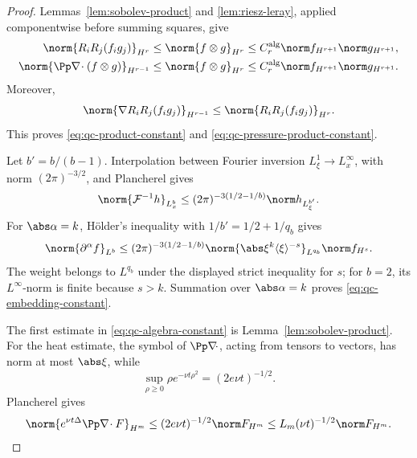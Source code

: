 \begin{proof}
Lemmas~\ref{lem:sobolev-product} and \ref{lem:riesz-leray}, applied
componentwise before summing squares, give
\begin{align*}
 \norm{R_iR_j(f_i g_j)}_{H^r}
 &\le\norm{f\otimes g}_{H^r}
 \le C_r^{\rm alg}\norm f_{H^{r+1}}\norm g_{H^{r+1}},\\
 \norm{\Pp\nabla\!\cdot(f\otimes g)}_{H^{r-1}}
 &\le\norm{f\otimes g}_{H^r}
 \le C_r^{\rm alg}\norm f_{H^{r+1}}\norm g_{H^{r+1}}.
\end{align*}
Moreover,
\[
 \norm{\nabla R_iR_j(f_i g_j)}_{H^{r-1}}
 \le\norm{R_iR_j(f_i g_j)}_{H^r}.
\]
This proves \eqref{eq:qc-product-constant} and
\eqref{eq:qc-pressure-product-constant}.

Let \(b'=b/(b-1)\).  Interpolation between Fourier inversion
\(L^1_\xi\to L^\infty_x\), with norm \((2\pi)^{-3/2}\), and Plancherel
gives
\[
 \norm{\mathcal F^{-1}h}_{L^b_x}
 \le(2\pi)^{-3(1/2-1/b)}\norm h_{L^{b'}_\xi}.
\]
For \(\abs\alpha=k\), H\"older's inequality with
\(1/b'=1/2+1/q_b\) gives
\[
 \norm{\partial^\alpha f}_{L^b}
 \le(2\pi)^{-3(1/2-1/b)}
 \norm{\abs\xi^k\langle\xi\rangle^{-s}}_{L^{q_b}}
 \norm f_{H^s}.
\]
The weight belongs to \(L^{q_b}\) under the displayed strict inequality
for \(s\); for \(b=2\), its \(L^\infty\)-norm is finite because \(s>k\).
Summation over \(\abs\alpha=k\) proves
\eqref{eq:qc-embedding-constant}.

The first estimate in \eqref{eq:qc-algebra-constant} is
Lemma~\ref{lem:sobolev-product}.  For the heat estimate, the symbol of
\(\Pp\nabla\!\cdot\), acting from tensors to vectors, has norm at most
\(\abs\xi\), while
\[
 \sup_{\rho\ge0}\rho e^{-\nu t\rho^2}=(2e\nu t)^{-1/2}.
\]
Plancherel gives
\[
 \norm{e^{\nu t\Delta}\Pp\nabla\!\cdot F}_{H^m}
 \le(2e\nu t)^{-1/2}\norm F_{H^m}
 \le L_m(\nu t)^{-1/2}\norm F_{H^m}.
\]
\end{proof}

